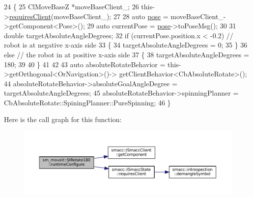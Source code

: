 \begin{DoxyCode}
24     \{
25         ClMoveBaseZ *moveBaseClient\_;
26         this->\hyperlink{classsmacc_1_1ISmaccState_a7f95c9f0a6ea2d6f18d1aec0519de4ac}{requiresClient}(moveBaseClient\_);
27 
28         \textcolor{keyword}{auto} \hyperlink{namespaceinteractive__marker_a06e4691dc5f93e0da6dc9a6efa8d99b5}{pose} = moveBaseClient\_->getComponent<Pose>();
29         \textcolor{keyword}{auto} currentPose = \hyperlink{namespaceinteractive__marker_a06e4691dc5f93e0da6dc9a6efa8d99b5}{pose}->toPoseMsg();
30 
31         \textcolor{keywordtype}{double} targetAbsoluteAngleDegrees;
32         \textcolor{keywordflow}{if} (currentPose.position.x < -0.2) \textcolor{comment}{// robot is at negative x-axis side}
33         \{
34                 targetAbsoluteAngleDegrees = 0;
35         \}
36         \textcolor{keywordflow}{else} \textcolor{comment}{// the robot in at positive x-axis side}
37         \{
38                 targetAbsoluteAngleDegrees = 180;
39              
40         \}
41 
42         
43         \textcolor{keyword}{auto} absoluteRotateBehavior = this->getOrthogonal<OrNavigation>()->
      getClientBehavior<CbAbsoluteRotate>();
44         absoluteRotateBehavior->absoluteGoalAngleDegree = targetAbsoluteAngleDegrees;
45         absoluteRotateBehavior->spinningPlanner = CbAbsoluteRotate::SpiningPlanner::PureSpinning;
46     \}
\end{DoxyCode}
Here is the call graph for this function\+:
\nopagebreak
\begin{figure}[H]
\begin{center}
\leavevmode
\includegraphics[width=350pt]{structsm__moveit_1_1StRotate180_af424dc219c107d5c3678c6fc915d9c68_cgraph}
\end{center}
\end{figure}
\mbox{\label{structsm__moveit_1_1StRotate180_a7ce91eeeb1a8740e1a6f797a41dc940a}} 
